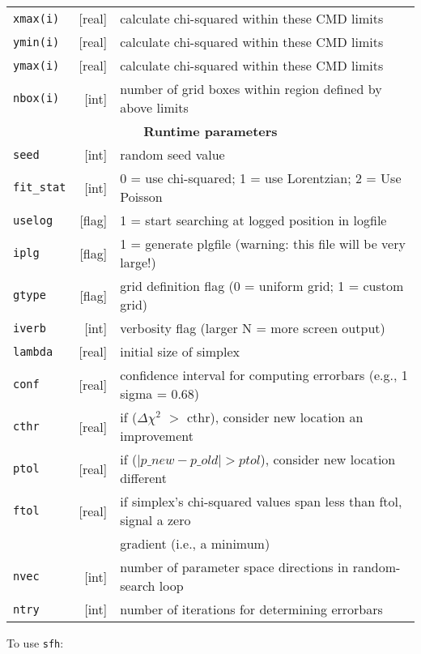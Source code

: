 \documentclass[12pt]{book}
\def\ttg{\tt\color{DarkGreen}}
\def\tto{\tt\color{myOrange}}
\begin{document}
{\begin{tabular}{|lr|l|}
{\tto   xmax(i)} & [real] & calculate chi-squared within these CMD limits\\
{\tto   ymin(i)} & [real] & calculate chi-squared within these CMD limits\\
{\tto   ymax(i)} & [real] & calculate chi-squared within these CMD limits\\
{\tto   nbox(i)} &  [int] & number of grid boxes within region defined by above limits\\ 
\hline
\multicolumn{3}{|c|}{\bf Runtime parameters} \\ 
\hline
{\tto seed}      &  [int]&  random seed value \\
{\tto fit\_stat} &  [int]&  0 = use chi-squared; 1 = use Lorentzian; 2 = Use Poisson\\
{\tto uselog}    & [flag]&  1 = start searching at logged position in logfile\\
{\tto iplg}      & [flag]&  1 = generate plgfile (warning: this file will be very large!)\\
{\tto gtype}     & [flag]&  grid definition flag (0 = uniform grid; 1 = custom grid)\\
{\tto iverb}     &  [int]& verbosity flag (larger N = more screen output)\\
{\tto lambda}    & [real]& initial size of simplex\\
{\tto conf}      & [real]& confidence interval for computing errorbars (e.g., 1 sigma = 0.68)\\
{\tto cthr}      & [real]& if ($\Delta\chi^2$ $>$ cthr), consider new location an improvement\\
{\tto ptol}      & [real]& if ($|p\_new - p\_old| > ptol$), consider new location different\\
{\tto ftol}      & [real]& if simplex's chi-squared values span less than ftol, signal a zero \\
                 &       & gradient (i.e., a minimum) \\
{\tto nvec}      &  [int]& number of parameter space directions in random-search loop\\
{\tto ntry}      &  [int]& number of iterations for determining errorbars\\
\hline
\end{tabular}
}

\clearpage

\noindent
To use {\ttg sfh}:
\end{document}
